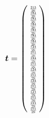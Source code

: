 $$
\bm{t} = 
\left ( \scalemath{0.55} { \begin{array}{c}
\frac{213}{29}\\
\frac{184}{29}\\
\frac{184}{29}\\
\frac{184}{29}\\
\frac{184}{29}\\
\frac{184}{29}\\
\frac{184}{29}\\
\frac{124}{29}\\
\frac{101}{29}\\
\frac{124}{29}\\
\frac{101}{29}\\
\frac{124}{29}\\
\frac{101}{29}\\
\frac{124}{29}\\
\frac{101}{29}\\
\frac{124}{29}\\
\frac{101}{29}\\
\frac{124}{29}\\
\frac{101}{29}\\
\end{array} } \right)
$$

